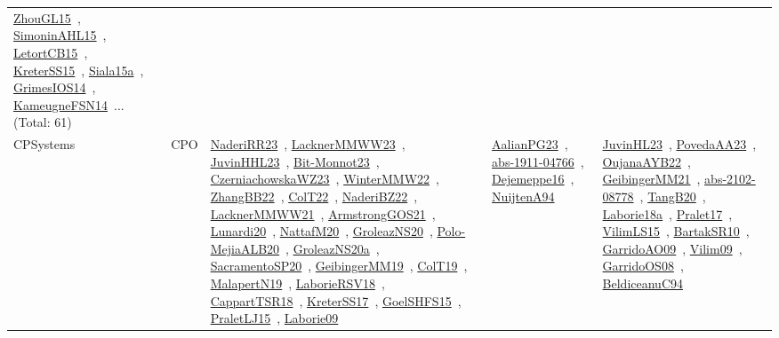 {\begin{longtable}{lp{3cm}>{\raggedright\arraybackslash}p{6cm}>{\raggedright\arraybackslash}p{6cm}>{\raggedright\arraybackslash}p{8cm}}
\href{works/ZhouGL15.pdf}{ZhouGL15}~\cite{ZhouGL15}, \href{works/SimoninAHL15.pdf}{SimoninAHL15}~\cite{SimoninAHL15}, \href{works/LetortCB15.pdf}{LetortCB15}~\cite{LetortCB15}, \href{works/KreterSS15.pdf}{KreterSS15}~\cite{KreterSS15}, \href{works/Siala15a.pdf}{Siala15a}~\cite{Siala15a}, \href{works/GrimesIOS14.pdf}{GrimesIOS14}~\cite{GrimesIOS14}, \href{works/KameugneFSN14.pdf}{KameugneFSN14}~\cite{KameugneFSN14}... (Total: 61)\\
CPSystems & CPO & \href{works/NaderiRR23.pdf}{NaderiRR23}~\cite{NaderiRR23}, \href{works/LacknerMMWW23.pdf}{LacknerMMWW23}~\cite{LacknerMMWW23}, \href{works/JuvinHHL23.pdf}{JuvinHHL23}~\cite{JuvinHHL23}, \href{works/Bit-Monnot23.pdf}{Bit-Monnot23}~\cite{Bit-Monnot23}, \href{works/CzerniachowskaWZ23.pdf}{CzerniachowskaWZ23}~\cite{CzerniachowskaWZ23}, \href{works/WinterMMW22.pdf}{WinterMMW22}~\cite{WinterMMW22}, \href{works/ZhangBB22.pdf}{ZhangBB22}~\cite{ZhangBB22}, \href{works/ColT22.pdf}{ColT22}~\cite{ColT22}, \href{works/NaderiBZ22.pdf}{NaderiBZ22}~\cite{NaderiBZ22}, \href{works/LacknerMMWW21.pdf}{LacknerMMWW21}~\cite{LacknerMMWW21}, \href{works/ArmstrongGOS21.pdf}{ArmstrongGOS21}~\cite{ArmstrongGOS21}, \href{works/Lunardi20.pdf}{Lunardi20}~\cite{Lunardi20}, \href{works/NattafM20.pdf}{NattafM20}~\cite{NattafM20}, \href{works/GroleazNS20.pdf}{GroleazNS20}~\cite{GroleazNS20}, \href{works/Polo-MejiaALB20.pdf}{Polo-MejiaALB20}~\cite{Polo-MejiaALB20}, \href{works/GroleazNS20a.pdf}{GroleazNS20a}~\cite{GroleazNS20a}, \href{works/SacramentoSP20.pdf}{SacramentoSP20}~\cite{SacramentoSP20}, \href{works/GeibingerMM19.pdf}{GeibingerMM19}~\cite{GeibingerMM19}, \href{works/ColT19.pdf}{ColT19}~\cite{ColT19}, \href{works/MalapertN19.pdf}{MalapertN19}~\cite{MalapertN19}, \href{works/LaborieRSV18.pdf}{LaborieRSV18}~\cite{LaborieRSV18}, \href{works/CappartTSR18.pdf}{CappartTSR18}~\cite{CappartTSR18}, \href{works/KreterSS17.pdf}{KreterSS17}~\cite{KreterSS17}, \href{works/GoelSHFS15.pdf}{GoelSHFS15}~\cite{GoelSHFS15}, \href{works/PraletLJ15.pdf}{PraletLJ15}~\cite{PraletLJ15}, \href{works/Laborie09.pdf}{Laborie09}~\cite{Laborie09} & \href{works/AalianPG23.pdf}{AalianPG23}~\cite{AalianPG23}, \href{works/abs-1911-04766.pdf}{abs-1911-04766}~\cite{abs-1911-04766}, \href{works/Dejemeppe16.pdf}{Dejemeppe16}~\cite{Dejemeppe16}, \href{works/NuijtenA94.pdf}{NuijtenA94}~\cite{NuijtenA94} & \href{works/JuvinHL23.pdf}{JuvinHL23}~\cite{JuvinHL23}, \href{works/PovedaAA23.pdf}{PovedaAA23}~\cite{PovedaAA23}, \href{works/OujanaAYB22.pdf}{OujanaAYB22}~\cite{OujanaAYB22}, \href{works/GeibingerMM21.pdf}{GeibingerMM21}~\cite{GeibingerMM21}, \href{works/abs-2102-08778.pdf}{abs-2102-08778}~\cite{abs-2102-08778}, \href{works/TangB20.pdf}{TangB20}~\cite{TangB20}, \href{works/Laborie18a.pdf}{Laborie18a}~\cite{Laborie18a}, \href{works/Pralet17.pdf}{Pralet17}~\cite{Pralet17}, \href{works/VilimLS15.pdf}{VilimLS15}~\cite{VilimLS15}, \href{works/BartakSR10.pdf}{BartakSR10}~\cite{BartakSR10}, \href{works/GarridoAO09.pdf}{GarridoAO09}~\cite{GarridoAO09}, \href{works/Vilim09.pdf}{Vilim09}~\cite{Vilim09}, \href{works/GarridoOS08.pdf}{GarridoOS08}~\cite{GarridoOS08}, \href{works/BeldiceanuC94.pdf}{BeldiceanuC94}~\cite{BeldiceanuC94}\\

\end{longtable}}
